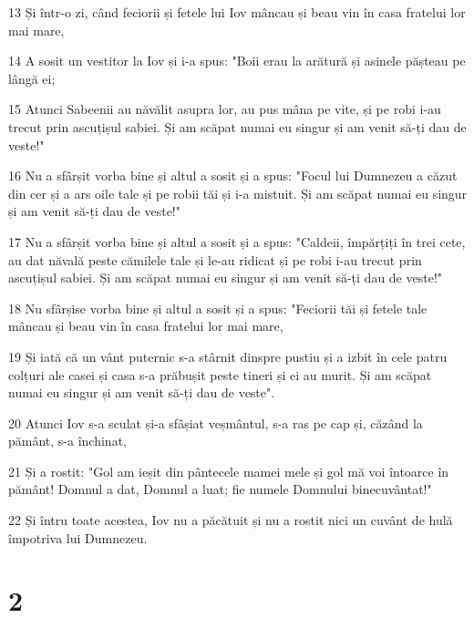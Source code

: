 \par 13 Și într-o zi, când feciorii și fetele lui Iov mâncau și beau vin în casa fratelui lor mai mare,
\par 14 A sosit un vestitor la Iov și i-a spus: "Boii erau la arătură și asinele pășteau pe lângă ei;
\par 15 Atunci Sabeenii au năvălit asupra lor, au pus mâna pe vite, și pe robi i-au trecut prin ascuțișul sabiei. Și am scăpat numai eu singur și am venit să-ți dau de veste!"
\par 16 Nu a sfârșit vorba bine și altul a sosit și a spus: "Focul lui Dumnezeu a căzut din cer și a ars oile tale și pe robii tăi și i-a mistuit. Și am scăpat numai eu singur și am venit să-ți dau de veste!"
\par 17 Nu a sfârșit vorba bine și altul a sosit și a spus: "Caldeii, împărțiți în trei cete, au dat năvală peste cămilele tale și le-au ridicat și pe robi i-au trecut prin ascuțișul sabiei. Și am scăpat numai eu singur și am venit să-ți dau de veste!"
\par 18 Nu sfârșise vorba bine și altul a sosit și a spus: "Feciorii tăi și fetele tale mâncau și beau vin în casa fratelui lor mai mare,
\par 19 Și iată că un vânt puternic s-a stârnit dinspre pustiu și a izbit în cele patru colțuri ale casei și casa s-a prăbușit peste tineri și ei au murit. Și am scăpat numai eu singur și am venit să-ți dau de veste".
\par 20 Atunci Iov s-a sculat și-a sfâșiat veșmântul, s-a ras pe cap și, căzând la pământ, s-a închinat,
\par 21 Și a rostit: "Gol am ieșit din pântecele mamei mele și gol mă voi întoarce în pământ! Domnul a dat, Domnul a luat; fie numele Domnului binecuvântat!"
\par 22 Și întru toate acestea, Iov nu a păcătuit și nu a rostit nici un cuvânt de hulă împotriva lui Dumnezeu.

\chapter{2}

